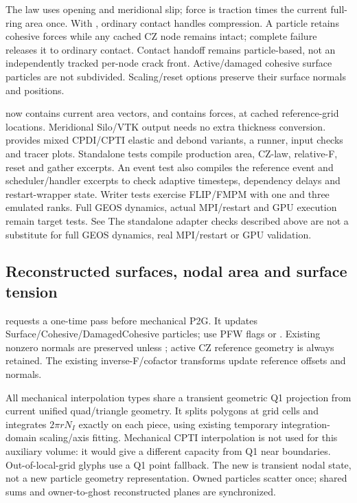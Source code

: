 The law uses opening and meridional slip; force is traction times the current
full-ring area once. With , ordinary contact
handles compression. A particle retains cohesive forces while any cached CZ
node remains intact; complete failure releases it to ordinary contact.
Contact handoff remains particle-based, not an independently tracked per-node
crack front. Active/damaged cohesive surface particles are not subdivided.
Scaling/reset options preserve their surface normals and positions.

 now contains current area vectors, and
 contains forces, at cached reference-grid locations.
Meridional Silo/VTK output needs no extra thickness conversion.
 provides mixed CPDI/CPTI elastic and debond
variants, a runner, input checks and tracer plots. Standalone tests compile
production area, CZ-law, relative-F, reset and gather excerpts. An event test
also compiles the reference event and scheduler/handler excerpts to check
adaptive timesteps, dependency delays and restart-wrapper state. Writer tests
exercise FLIP/FMPM with one and three emulated ranks. Full GEOS dynamics,
actual MPI/restart and GPU execution remain target tests. See
The standalone adapter checks described above are not a substitute for full GEOS dynamics, real MPI/restart or GPU validation.


\subsection{Reconstructed surfaces, nodal area and surface tension}
\label{sec:axisymmetric-surfaces}
 requests a one-time
pass before mechanical P2G. It updates Surface/Cohesive/DamagedCohesive particles;
use PFW flags or . Existing nonzero normals are
preserved unless ; active
CZ reference geometry is always retained. The existing inverse-F/cofactor
transforms update reference offsets and normals.

All mechanical interpolation types share a transient geometric Q1 projection
from current unified quad/triangle geometry. It splits polygons at grid cells
and integrates $2\pi rN_I$ exactly on each piece, using existing temporary
integration-domain scaling/axis fitting. Mechanical CPTI interpolation is not
used for this auxiliary volume: it would give a different capacity from Q1
near boundaries. Out-of-local-grid glyphs use a Q1 point fallback.
The new  is transient nodal state, not a
new particle geometry representation. Owned particles scatter once; shared
sums and owner-to-ghost reconstructed planes are synchronized.

